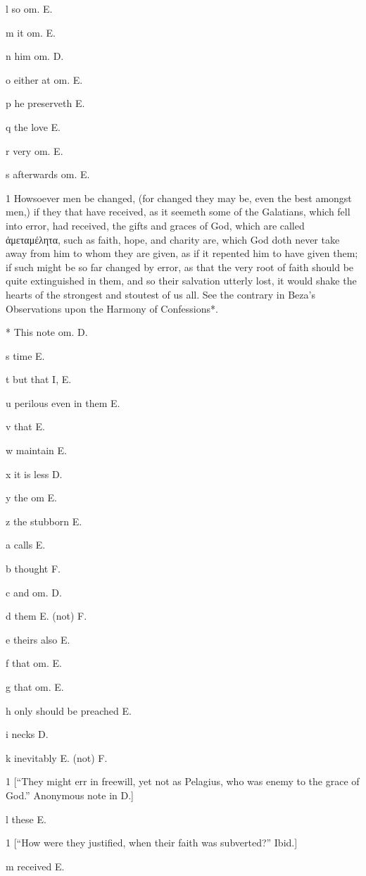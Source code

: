 l
so om. E.

m
it om. E.

n
him om. D.

o
either at om. E.

p
he preserveth E.

q
the love E.

r
very om. E.

s
afterwards om. E.

1
Howsoever men be changed, (for changed they may be, even the best amongst men,) if they that have received, as it seemeth some of the Galatians, which fell into error, had received, the gifts and graces of God, which are called ἀμεταμέλητα, such as faith, hope, and charity are, which God doth never take away from him to whom they are given, as if it repented him to have given them; if such might be so far changed by error, as that the very root of faith should be quite extinguished in them, and so their salvation utterly lost, it would shake the hearts of the strongest and stoutest of us all. See the contrary in Beza’s Observations upon the Harmony of Confessions*.

*
This note om. D.

s
time E.

t
but that I, E.

u
perilous even in them E.

v
that E.

w
maintain E.

x
it is less D.

y
the om E.

z
the stubborn E.

a
calls E.

b
thought F.

c
and om. D.

d
them E. (not) F.

e
theirs also E.

f
that om. E.

g
that om. E.

h
only should be preached E.

i
necks D.

k
inevitably E. (not) F.

1
[“They might err in freewill, yet not as Pelagius, who was enemy to the grace of God.” Anonymous note in D.]

l
these E.

1
[“How were they justified, when their faith was subverted?” Ibid.]

m
received E.

